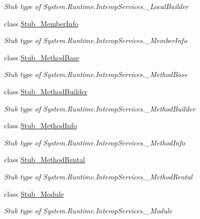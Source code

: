 \begin{DoxyCompactItemize}
\begin{DoxyCompactList}\small\item\em Stub type of System.\-Runtime.\-Interop\-Services.\-\_\-\-Local\-Builder\end{DoxyCompactList}\item 
class \hyperlink{class_system_1_1_runtime_1_1_interop_services_1_1_fakes_1_1_stub___member_info}{Stub\-\_\-\-Member\-Info}
\begin{DoxyCompactList}\small\item\em Stub type of System.\-Runtime.\-Interop\-Services.\-\_\-\-Member\-Info\end{DoxyCompactList}\item 
class \hyperlink{class_system_1_1_runtime_1_1_interop_services_1_1_fakes_1_1_stub___method_base}{Stub\-\_\-\-Method\-Base}
\begin{DoxyCompactList}\small\item\em Stub type of System.\-Runtime.\-Interop\-Services.\-\_\-\-Method\-Base\end{DoxyCompactList}\item 
class \hyperlink{class_system_1_1_runtime_1_1_interop_services_1_1_fakes_1_1_stub___method_builder}{Stub\-\_\-\-Method\-Builder}
\begin{DoxyCompactList}\small\item\em Stub type of System.\-Runtime.\-Interop\-Services.\-\_\-\-Method\-Builder\end{DoxyCompactList}\item 
class \hyperlink{class_system_1_1_runtime_1_1_interop_services_1_1_fakes_1_1_stub___method_info}{Stub\-\_\-\-Method\-Info}
\begin{DoxyCompactList}\small\item\em Stub type of System.\-Runtime.\-Interop\-Services.\-\_\-\-Method\-Info\end{DoxyCompactList}\item 
class \hyperlink{class_system_1_1_runtime_1_1_interop_services_1_1_fakes_1_1_stub___method_rental}{Stub\-\_\-\-Method\-Rental}
\begin{DoxyCompactList}\small\item\em Stub type of System.\-Runtime.\-Interop\-Services.\-\_\-\-Method\-Rental\end{DoxyCompactList}\item 
class \hyperlink{class_system_1_1_runtime_1_1_interop_services_1_1_fakes_1_1_stub___module}{Stub\-\_\-\-Module}
\begin{DoxyCompactList}\small\item\em Stub type of System.\-Runtime.\-Interop\-Services.\-\_\-\-Module\end{DoxyCompactList}\item 

\end{DoxyCompactItemize}
